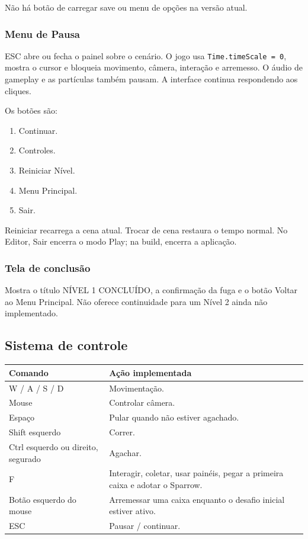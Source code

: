 \documentclass[12pt,a4paper]{article}
\begin{document}
Não há botão de carregar save ou menu de opções na versão atual.

\subsubsection*{Menu de Pausa}

ESC abre ou fecha o painel sobre o cenário. O jogo usa
\texttt{Time.timeScale = 0}, mostra o cursor e bloqueia movimento,
câmera, interação e arremesso. O áudio de gameplay e as partículas
também pausam. A interface continua respondendo aos cliques.

Os botões são:

\begin{enumerate}
\item Continuar.
\item Controles.
\item Reiniciar Nível.
\item Menu Principal.
\item Sair.
\end{enumerate}

Reiniciar recarrega a cena atual. Trocar de cena restaura o tempo
normal. No Editor, Sair encerra o modo Play; na build, encerra
a aplicação.

\subsubsection*{Tela de conclusão}

Mostra o título NÍVEL 1 CONCLUÍDO, a confirmação da fuga e
o botão Voltar ao Menu Principal. Não oferece continuidade para
um Nível 2 ainda não implementado.

\subsection{Sistema de controle}

\begin{center}
\begin{tabularx}{\textwidth}{|p{4.3cm}|X|}
\hline
\textbf{Comando} & \textbf{Ação implementada}\\
\hline
W / A / S / D & Movimentação.\\
\hline
Mouse & Controlar câmera.\\
\hline
Espaço & Pular quando não estiver agachado.\\
\hline
Shift esquerdo & Correr.\\
\hline
Ctrl esquerdo ou direito, segurado & Agachar.\\
\hline
F & Interagir, coletar, usar painéis, pegar a primeira caixa e adotar o Sparrow.\\
\hline
Botão esquerdo do mouse & Arremessar uma caixa enquanto o desafio inicial estiver ativo.\\
\hline
ESC & Pausar / continuar.\\
\hline
\end{tabularx}
\end{center}
\end{document}
